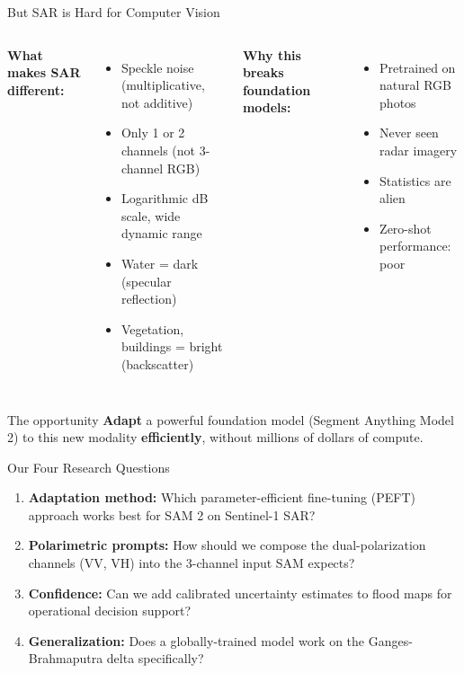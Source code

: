 \documentclass[10pt,aspectratio=169]{beamer}
\begin{document}
\begin{frame}{But SAR is Hard for Computer Vision}
\begin{columns}[T,onlytextwidth]
\textbf{What makes SAR different:}
\begin{itemize}
\item Speckle noise (multiplicative, not additive)
\item Only 1 or 2 channels (not 3-channel RGB)
\item Logarithmic dB scale, wide dynamic range
\item Water = dark (specular reflection)
\item Vegetation, buildings = bright (backscatter)
\end{itemize}

\textbf{Why this breaks foundation models:}
\begin{itemize}
\item Pretrained on natural RGB photos
\item Never seen radar imagery
\item Statistics are alien
\item Zero-shot performance: poor
\end{itemize}
\end{columns}

\vspace{0.5em}
\begin{alertblock}{The opportunity}
\textbf{Adapt} a powerful foundation model (Segment Anything Model 2) to this new modality \textbf{efficiently}, without millions of dollars of compute.
\end{alertblock}
\end{frame}

\begin{frame}{Our Four Research Questions}
\begin{enumerate}
\item[\textbf{RQ1}] \textbf{Adaptation method:} Which parameter-efficient fine-tuning (PEFT) approach works best for SAM 2 on Sentinel-1 SAR?

\vspace{0.3em}
\item[\textbf{RQ2}] \textbf{Polarimetric prompts:} How should we compose the dual-polarization channels (VV, VH) into the 3-channel input SAM expects?

\vspace{0.3em}
\item[\textbf{RQ3}] \textbf{Confidence:} Can we add calibrated uncertainty estimates to flood maps for operational decision support?

\vspace{0.3em}
\item[\textbf{RQ4}] \textbf{Generalization:} Does a globally-trained model work on the Ganges-Brahmaputra delta specifically?
\end{enumerate}
\end{frame}
\end{document}
